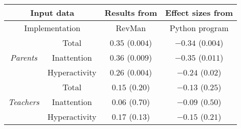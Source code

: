 \begin{tabular}{cccc}
\toprule

\multicolumn{2}{c}{Input data} & \shortstack{ Results from \\ \citet{Cortese2016} } & \shortstack{ Effect sizes from \\ \citet{Cortese2016} } \\
\hline
\multicolumn{2}{c}{Implementation} & \shortstack{ RevMan \\ \citet{RevMan} } & Python program\\
\hline
\multirow{3}{*}{ \textit{Parents} } & Total & $0.35$ ($0.004$) & $-0.34$ ($0.004$)\\
 & Inattention  & $0.36$ ($0.009$) & $-0.35$ ($0.011$)\\
 & Hyperactivity  & $0.26$ ($0.004$) & $-0.24$ ($0.02$)\\
\multirow{3}{*}{ \textit{Teachers} } & Total & $0.15$ ($0.20$) & $-0.13$ ($0.25$)\\
 & Inattention  & $0.06$ ($0.70$) & $-0.09$ ($0.50$)\\
 & Hyperactivity  & $0.17$ ($0.13$) & $-0.15$ ($0.21$)\\
\bottomrule
\end{tabular}

